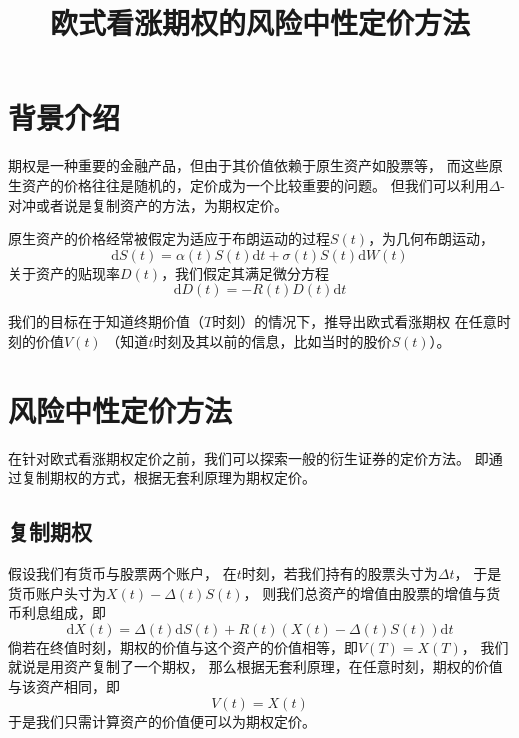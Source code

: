 \documentclass[12pt]{ctexart}
\title{欧式看涨期权的风险中性定价方法}
\date{}
\def\diff{\mathrm{d}}
\begin{document}
    \maketitle

    \section{背景介绍}
    期权是一种重要的金融产品，但由于其价值依赖于原生资产如股票等，
    而这些原生资产的价格往往是随机的，定价成为一个比较重要的问题。
    但我们可以利用$\Delta$-对冲或者说是复制资产的方法，为期权定价。

    原生资产的价格经常被假定为适应于布朗运动的过程$S(t)$，为几何布朗运动，
    \begin{equation}
        \label{eq:stock price}
        \diff S(t)=\alpha(t)S(t)\diff t+\sigma(t)S(t)\diff W(t)
    \end{equation}
    关于资产的贴现率$D(t)$，我们假定其满足微分方程
    \begin{equation}
        \label{eq:discount}
        \diff D(t)=-R(t)D(t)\diff t
    \end{equation}
    
    我们的目标在于知道终期价值（$T$时刻）的情况下，推导出欧式看涨期权
    在任意时刻的价值$V(t)$
    （知道$t$时刻及其以前的信息，比如当时的股价$S(t)$）。

    \section{风险中性定价方法}
    在针对欧式看涨期权定价之前，我们可以探索一般的衍生证券的定价方法。
    即通过复制期权的方式，根据无套利原理为期权定价。

    \subsection{复制期权}
    假设我们有货币与股票两个账户，
    在$t$时刻，若我们持有的股票头寸为$\Delta t$，
    于是货币账户头寸为$X(t)-\Delta(t)S(t)$，
    则我们总资产的增值由股票的增值与货币利息组成，即
    \begin{equation}
        \label{eq:asset value}        
        \diff X(t)=\Delta(t)\diff S(t)+R(t)(X(t)-\Delta(t)S(t))\diff t
    \end{equation}
    倘若在终值时刻，期权的价值与这个资产的价值相等，即$V(T)=X(T)$，
    我们就说是用资产复制了一个期权，
    那么根据无套利原理，在任意时刻，期权的价值与该资产相同，即
    \[V(t)=X(t)\]
    于是我们只需计算资产的价值便可以为期权定价。
\end{document}
